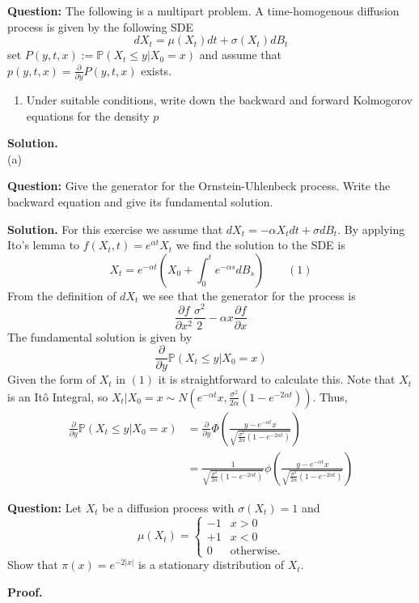 \documentclass{article}
\begin{document}
\begin{tcolorbox}[colframe=black,colback=gray!5,boxrule=0.5pt]
\textbf{Question:} The following is a multipart problem. A time-homogenous diffusion process is given by the following SDE 
$$dX_t = \mu(X_t)dt + \sigma(X_t)dB_t$$
set $P(y,t,x) := \mathbb{P}(X_t\leq y|X_0=x)$ and assume that $p(y,t,x)=\frac{\partial}{\partial y}P(y,t,x)$ exists.
\begin{enumerate}[label=(\alph*)]
    \item Under suitable conditions, write down the backward and forward Kolmogorov equations for the density $p$
\end{enumerate}
\end{tcolorbox}
\textbf{Solution.} \\
(a) 

\begin{tcolorbox}[colframe=black,colback=gray!5,boxrule=0.5pt]
\textbf{Question:} Give the generator for the Ornstein-Uhlenbeck process. Write the backward equation and give its fundamental solution.
\end{tcolorbox}
\textbf{Solution.} For this exercise we assume that $dX_t = -\alpha X_tdt + \sigma dB_t$. By applying Ito's lemma to $f(X_t,t)= e^{\alpha t}X_t$ we find the solution to the SDE is 
$$X_t = e^{-\alpha t}\left(X_0 + \int_0^te^{-\alpha s}dB_s\right)\quad\quad(1)$$
From the definition of $dX_t$ we see that the generator for the process is
$$\frac{\partial f}{\partial x^2}\frac{\sigma^2}{2} - \alpha x\frac{\partial f}{\partial x}$$
The fundamental solution is given by 
$$\frac{\partial}{\partial y}\mathbb{P}(X_t\leq y | X_0=x)$$
Given the form of $X_t$ in $(1)$ it is straightforward to calculate this. Note that $X_t$ is an Itô Integral, so $X_t | X_0=x\sim N(e^{-\alpha t}x, \frac{\sigma^2}{2\alpha}(1-e^{-2\alpha t}))$. Thus, 
\begin{align*}
    \frac{\partial}{\partial y}\mathbb{P}(X_t\leq y | X_0=x) &= \frac{\partial}{\partial y}\Phi\left(\frac{y-e^{-\alpha t}x}{\sqrt{\frac{\sigma^2}{2\alpha}(1-e^{-2\alpha t})}}\right) \\
    &= \frac{1}{\sqrt{\frac{\sigma^2}{2\alpha}(1-e^{-2\alpha t})}}\phi\left(\frac{y-e^{-\alpha t}x}{\sqrt{\frac{\sigma^2}{2\alpha}(1-e^{-2\alpha t})}}\right)
\end{align*}

\begin{tcolorbox}[colframe=black,colback=gray!5,boxrule=0.5pt]
\textbf{Question:} Let $X_t$ be a diffusion process with $\sigma(X_t) = 1$ and 
\[\mu(X_t) = \begin{cases}
    -1 & x>0 \\
    +1 & x<0 \\
    0 & \text{otherwise.}
\end{cases}\]
Show that $\pi(x) = e^{-2 |x|}$ is a stationary distribution of $X_t$.
\end{tcolorbox}
\textbf{Proof.}
\end{document}
